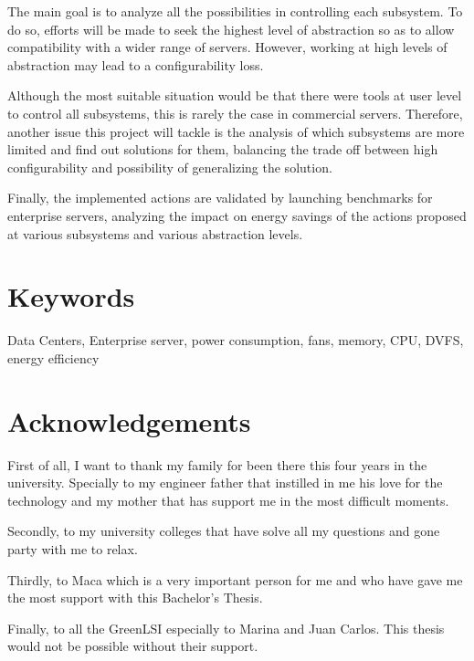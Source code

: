 The main goal is to analyze all the possibilities in controlling each subsystem. To do so, efforts will be made to seek the highest level of abstraction so as to allow compatibility with a wider range of servers. However, working at high levels of abstraction may lead to a configurability loss.

Although the most suitable situation would be that there were tools at user level to control all subsystems, this is rarely the case in commercial servers. Therefore, another issue this project will tackle is the analysis of which subsystems are more limited and find out solutions for them, balancing the trade off between high configurability and possibility of generalizing the solution.

Finally, the implemented actions are validated by launching benchmarks for enterprise servers, analyzing the impact on energy savings of the actions proposed at various subsystems and various abstraction levels.


\section*{Keywords}

Data Centers, Enterprise server, power consumption, fans, memory, CPU, DVFS, energy efficiency 

\section*{Acknowledgements}
\begin{itshape} 
    First of all, I want to thank my family for been there this four years in the university. Specially to my engineer father that instilled in me his love for the technology and my mother that has support me in the most difficult moments.
    
    Secondly, to my university colleges that have solve all my questions and gone party with me to relax.
    
    Thirdly, to Maca which is a very important person for me and who have gave me the most support with this Bachelor's Thesis.
    
    Finally, to all the GreenLSI especially to Marina and Juan Carlos. This thesis would not be possible without their support.
\end{itshape}